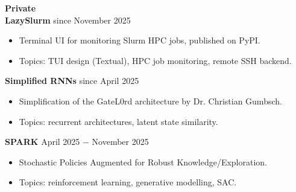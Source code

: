 \documentclass{article}
\begin{document}
\vspace{0.5cm}
\textbf{Private} \\

\noindent \textbf{LazySlurm} \href{https://github.com/RobinU434/LazySlurm}{\faGithubSquare} \hfill since November 2025
\begin{itemize}[noitemsep,nolistsep,leftmargin=*]
    \item Terminal UI for monitoring Slurm HPC jobs, published on PyPI.
    \item Topics: TUI design (Textual), HPC job monitoring, remote SSH backend.\\
\end{itemize}

\noindent \textbf{Simplified RNNs} \hfill since April 2025
\begin{itemize}[noitemsep,nolistsep,leftmargin=*]
    \item Simplification of the GateL0rd architecture by Dr. Christian Gumbsch.
    \item Topics: recurrent architectures, latent state similarity.\\
\end{itemize}

\noindent \textbf{SPARK} \href{https://github.com/RobinU434/SPARK}{\faGithubSquare} \hfill April 2025 $-$ November 2025
\begin{itemize}[noitemsep,nolistsep,leftmargin=*]
    \item Stochastic Policies Augmented for Robust Knowledge/Exploration.
    \item Topics: reinforcement learning, generative modelling, SAC.\\
\end{itemize} 
\end{document}
